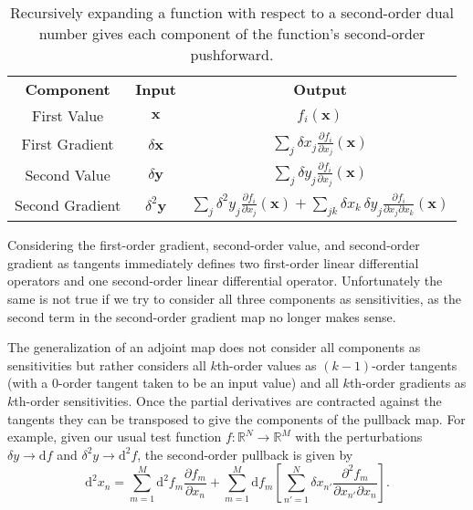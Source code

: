 \begin{table*}[t!]
	\centering
	\renewcommand{\arraystretch}{2}
	\begin{tabular}{ccc}
	\rowcolor[gray]{0.9} \textbf{Component} & \textbf{Input} & \textbf{Output} \\
	First Value & 
	$\mathbf{x}$ & 
	$f_{i} \! \left( \mathbf{x} \right)$ 
	\\
	\rowcolor[gray]{0.9} 
	First Gradient & 
	$\delta \mathbf{x}$ &
	$\displaystyle \sum_{j} \delta x_{j}  \frac{ \partial f_{i} }{ \partial x_{j} } \! \left( \mathbf{x} \right)$
	\\
	Second Value & 
	$\delta \mathbf{y} $ & 
	$\displaystyle \sum_{j} \delta y_{j} \frac{ \partial f_{i} }{ \partial x_{j} } \! \left( \mathbf{x} \right)$
	\\
	\rowcolor[gray]{0.9} 
	Second Gradient & 
	$\delta^{2} \mathbf{y} $ & 
	$\displaystyle \sum_{j} \delta^{2} y_{j} \frac{ \partial f_{i} }{ \partial x_{j} } \! \left( \mathbf{x} \right)
	+ \sum_{jk} \delta x_{k} \, \delta y_{j}
	\frac{ \partial f_{i} }{ \partial x_{j} \partial x_{k} } \! \left( \mathbf{x} \right)$
	\\
	\end{tabular}
	\caption{Recursively expanding a function with respect to a second-order dual number 
	gives each component of the function's second-order pushforward.
	\label{tab:secondOrder}}
\end{table*}

Considering the first-order gradient, second-order value, and second-order gradient as tangents 
immediately defines two first-order linear differential operators and one second-order linear 
differential operator.  Unfortunately the same is not true if we try to consider all three components
as sensitivities, as the second term in the second-order gradient map no longer makes
sense.  

The generalization of an adjoint map does not consider all components as sensitivities but rather
considers all $k$th-order values as $(k - 1)$-order tangents (with a $0$-order tangent
taken to be an input value) and all $k$th-order gradients as $k$th-order sensitivities.  Once the partial
derivatives are contracted against the tangents they can be transposed to give the
components of the pullback map.  For example, given our usual test function 
$f : \mathbb{R}^{N} \rightarrow \mathbb{R}^{M}$ with the perturbations 
$\delta y \rightarrow \mathrm{d} f$ and $\delta^{2} y \rightarrow \mathrm{d}^{2} f$, the 
second-order pullback is given by
%
\begin{equation*}
\mathrm{d}^{2} x_{n}
= \sum_{m = 1}^{M} \mathrm{d}^{2} f_{m} \frac{ \partial f_{m} }{ \partial x_{n} }
+ \sum_{m = 1}^{M} \mathrm{d} f_{m} 
\left[ \sum_{n'=1}^{N} \delta x_{n'} \frac{ \partial^{2} f_{m} }{ \partial x_{n'} \partial x_{n} } \right].
\end{equation*}

